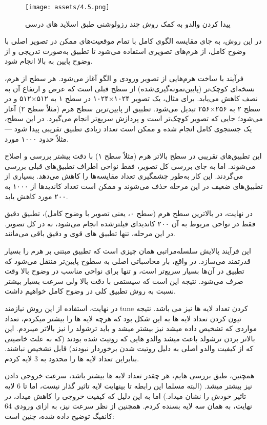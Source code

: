 \documentclass[a4paper,12pt]{article}
\begin{document}
 \begin{figure}[h]
	\centering
	\texttt{[image: assets/4.5.png]}
	\caption{\textcolor{CustomAccent}{پیدا کردن والدو به کمک روش چند رزولوشنی طبق اسلاید های درسی}}
\end{figure}

در این روش، به جای مقایسه الگوی کامل با تمام موقعیت‌های ممکن در تصویر اصلی با وضوح کامل، از هرم‌های تصویری استفاده می‌شود تا تطبیق به‌صورت تدریجی و از وضوح پایین به بالا انجام شود.

فرآیند با ساخت هرم‌هایی از تصویر ورودی و الگو آغاز می‌شود. هر سطح از هرم، نسخه‌ای کوچک‌تر (پایین‌نمونه‌گیری‌شده) از سطح قبلی است که عرض و ارتفاع آن به نصف کاهش می‌یابد. برای مثال، یک تصویر ۱۰۲۴×۱۰۲۴ در سطح ۱ به ۵۱۲×۵۱۲ و در سطح ۲ به ۲۵۶×۲۵۶ تبدیل می‌شود. تطبیق از پایین‌ترین سطح هرم (مثلاً سطح ۲) آغاز می‌شود؛ جایی که تصویر کوچک‌تر است و پردازش سریع‌تر انجام می‌گیرد. در این سطح، یک جستجوی کامل انجام شده و ممکن است تعداد زیادی تطبیق تقریبی پیدا شود — مثلاً حدود ۱۰۰۰ مورد.

این تطبیق‌های تقریبی در سطح بالاتر هرم (مثلاً سطح ۱) با دقت بیشتر بررسی و اصلاح می‌شوند. اما به جای بررسی کل تصویر، فقط نواحی اطراف تطبیق‌های قبلی بررسی می‌گردند. این کار به‌طور چشمگیری تعداد مقایسه‌ها را کاهش می‌دهد. بسیاری از تطبیق‌های ضعیف در این مرحله حذف می‌شوند و ممکن است تعداد کاندیدها از ۱۰۰۰ به ۲۰۰ مورد کاهش یابد.

در نهایت، در بالاترین سطح هرم (سطح ۰، یعنی تصویر با وضوح کامل)، تطبیق دقیق فقط در نواحی مربوط به آن ۲۰۰ کاندیدای فیلترشده انجام می‌شود، نه در کل تصویر. در این مرحله، تنها تطبیق‌ های قوی و دقیق باقی می‌مانند. 

این فرآیند پالایش سلسله‌مراتبی همان چیزی است که تطبیق مبتنی بر هرم را بسیار قدرتمند می‌سازد. در واقع، بار محاسباتی اصلی به سطوح پایین‌تر منتقل می‌شود که تطبیق در آن‌ها بسیار سریع‌تر است، و تنها برای نواحی مناسب در وضوح بالا وقت صرف می‌شود. نتیجه این است که سیستمی با دقت بالا ولی سرعت بسیار بیشتر نسبت به روش تطبیق کلی در وضوح کامل خواهیم داشت.

در نهایت، استفاده از این روش نیازمند tune کردن تعداد لایه ها نیز می باشد. نتیجه تیون کردن تعداد لایه ها به این شکل بود که هرچه لایه ها را بیشتر میکردم، تعداد مواردی که تشخیص داده میشد نیز بیشتر میشد و باید ترشولد را نیز بالاتر میبردم. این بالاتر بردن ترشولد باعث میشد والدو هایی که روتیت شده بودند (که به علت خاصیتی که از کیفیت والدو اصلی به دلیل روتیت شدن برخوردار نبودند) قابل تشخیص نباشند. بنابراین تعداد لایه ها را محدود به 3 لایه کردم.

همچنین، طبق بررسی هایم، هر چقدر تعداد لایه ها بیشتر باشد، سرعت خروجی دادن نیز بیشتر میشد. (البته مسلما این رابطه تا بینهایت لایه تاثیر گذار نیست، اما تا 6 لایه تاثیر خودش را نشان میداد.) اما به این دلیل که کیفیت خروجی را کاهش میداد، در نهایت، به همان سه لایه بسنده کردم. همچنین از نظر سرعت نیز، به ازای ورودی 64 کانفیگ توضیح داده شده، چنین است:
\end{document}
